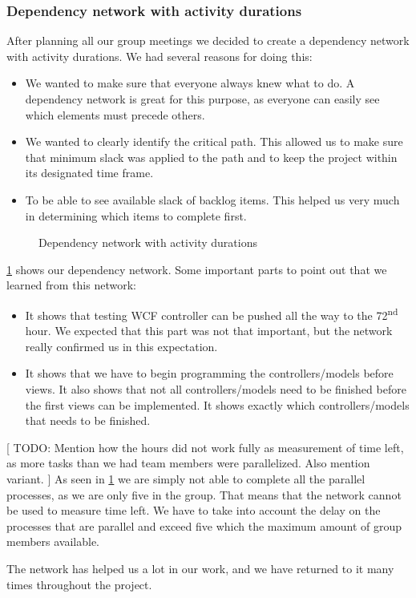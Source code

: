 \subsubsection{Dependency network with activity durations}
After planning all our group meetings we decided to create a dependency network with activity durations. We had several reasons for doing this:

\begin{itemize}
	\item We wanted to make sure that everyone always knew what to do. A dependency network is great for this purpose, as everyone can easily see which elements must precede others.
	\item We wanted to clearly identify the critical path. This allowed us to make sure that minimum slack was applied to the path and to keep the project within its designated time frame.
	\item To be able to see available slack of backlog items. This helped us very much in determining which items to complete first.
\end{itemize}

\begin{figure}[H]
  \caption{Dependency network with activity durations}
  \label{dependency network}
\end{figure}

\cref{dependency network} shows our dependency network.
Some important parts to point out that we learned from this network:
\begin{itemize}
	\item It shows that testing WCF controller can be pushed all the way to the 72\textsuperscript{nd} hour. We expected that this part was not that important, but the network really confirmed us in this expectation.
	\item It shows that we have to begin programming the controllers/models before views. It also shows that not all controllers/models need to be finished before the first views can be implemented. It shows exactly which controllers/models that needs to be finished.
\end{itemize}

[ TODO: Mention how the hours did not work fully as measurement of time left, as more tasks than we had team members were parallelized. Also mention variant. ]
As seen in \cref{dependency network} we are simply not able to complete all the parallel processes, as we are only five in the group. That means that the network cannot be used to measure time left. We have to take into account the delay on the processes that are parallel and exceed five which the maximum amount of group members available.

The network has helped us a lot in our work, and we have returned to it many times throughout the project.